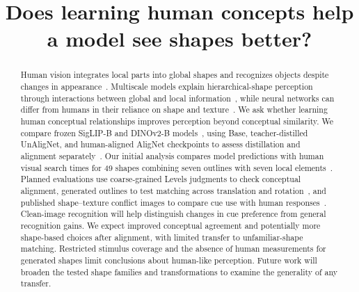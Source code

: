 \documentclass[11pt]{article}
\title{Does learning human concepts help a model see shapes better?}
\author{}
\date{}
\begin{document}
\maketitle
\begin{abstract}
Human vision integrates local parts into global shapes and recognizes objects despite changes in appearance~\cite{navon,biederman}. Multiscale models explain hierarchical-shape perception through interactions between global and local information~\cite{jacob}, while neural networks can differ from humans in their reliance on shape and texture~\cite{geirhos}. We ask whether learning human conceptual relationships improves perception beyond conceptual similarity. We compare frozen SigLIP-B and DINOv2-B models~\cite{siglip,dinov2}, using Base, teacher-distilled UnAligNet, and human-aligned AligNet checkpoints to assess distillation and alignment separately~\cite{alignet}. Our initial analysis compares model predictions with human visual search times for 49 shapes combining seven outlines with seven local elements~\cite{jacob}. Planned evaluations use coarse-grained Levels judgments to check conceptual alignment, generated outlines to test matching across translation and rotation~\cite{cooper,jolicoeur}, and published shape--texture conflict images to compare cue use with human responses~\cite{alignet,geirhos}. Clean-image recognition will help distinguish changes in cue preference from general recognition gains. We expect improved conceptual agreement and potentially more shape-based choices after alignment, with limited transfer to unfamiliar-shape matching. Restricted stimulus coverage and the absence of human measurements for generated shapes limit conclusions about human-like perception. Future work will broaden the tested shape families and transformations to examine the generality of any transfer.
\end{abstract}
\end{document}
